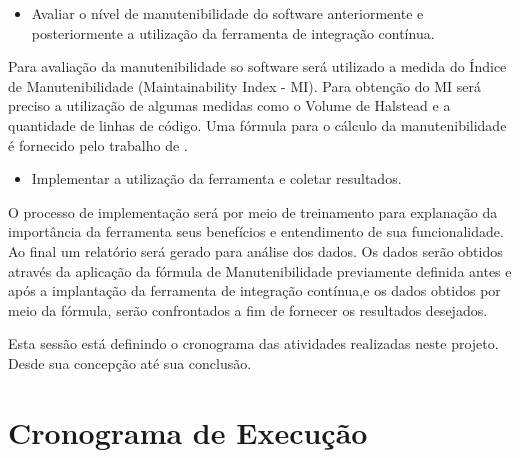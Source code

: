 \begin{itemize}
\item Avaliar o nível de manutenibilidade do software anteriormente e posteriormente a utilização da ferramenta de integração contínua.
\end{itemize}
Para avaliação da manutenibilidade so software será utilizado a medida do Índice de Manutenibilidade (Maintainability Index - MI). Para obtenção do MI será preciso a utilização de algumas medidas como o Volume de Halstead e a quantidade de linhas de código. Uma fórmula para o cálculo da manutenibilidade é fornecido pelo trabalho de .
\begin{itemize}

\item Implementar a utilização da ferramenta e coletar resultados.
\end{itemize}
O processo de implementação será por meio de treinamento para explanação da importância da ferramenta seus benefícios e entendimento de sua funcionalidade. Ao final um relatório será gerado para análise dos dados. Os dados serão obtidos através da aplicação da fórmula de Manutenibilidade previamente definida antes e após a implantação da ferramenta de integração contínua,e os dados obtidos por meio da fórmula, serão confrontados a fim de fornecer os resultados desejados.

Esta sessão está definindo o cronograma das atividades realizadas neste projeto. Desde sua concepção até sua conclusão.
\pagebreak
\section{Cronograma de Execução}

